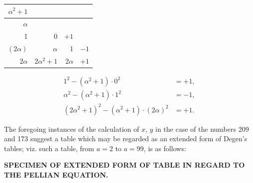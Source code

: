 \documentclass[11pt,a4paper]{book}
\begin{document}
{{{\begin{center}
\begin{tabular}{r|r|r|r}
$\alpha^{2}+1$ & & & \\ \hline
$\alpha$ & & & \\
1 & 0 & $+1$ & \\
$(2\alpha)$ & $\alpha$ & 1 & $-1$ \\
$2\alpha$ & $2\alpha^{2}+1$ & $2\alpha$ & $+1$
\end{tabular}
\end{center}
\[
\begin{aligned}
1^{2} - (\alpha^{2}+1) \cdot 0^{2} &= +1, \\
\alpha^{2} - (\alpha^{2}+1) \cdot 1^{2} &= -1, \\
(2\alpha^{2}+1)^{2} - (\alpha^{2}+1) \cdot (2\alpha)^{2} &= +1.
\end{aligned}
\]

\newpage
The foregoing instances of the calculation of $x$, $y$ in the case of the numbers 209 and 173 suggest a table which may be regarded as an extended form of Degen's tables; viz. such a table, from $a = 2$ to $a = 99$, is as follows:

\begin{center}
\textbf{SPECIMEN OF EXTENDED FORM OF TABLE IN REGARD TO THE PELLIAN EQUATION.}
\end{center}

}}}
\end{document}

